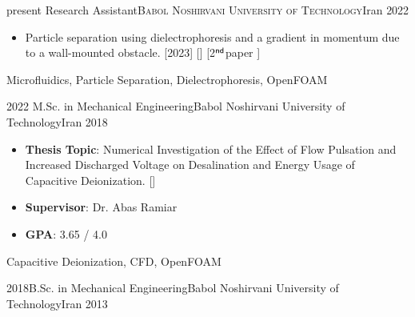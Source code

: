   \shorthandoff{:}

\begin{experiences}
  \experience
  {present}   {Research Assistant}{\normalfont\textsc{\small Babol Noshirvani University of Technology}}{Iran}
  {2022} {
    \begin{itemize}
      \item Particle separation using dielectrophoresis and a gradient in momentum due to a wall-mounted obstacle. [2023] [] [2$^{\sf{nd}}$\thinspace paper \hyperref[pub:derakhshan2023]{\color{linkcolor}{\footnotesize \kern-.4ex\raisebox{+.48ex}\faLevelDown}}]
    \end{itemize}
  }
  {Microfluidics, Particle Separation, Dielectrophoresis, OpenFOAM}
\end{experiences}

\vspace{-3pt}

\begin{experiences}
  \experience
  {2022}   {M.Sc. in Mechanical Engineering}{Babol Noshirvani University of Technology}{Iran}
  {2018} {
    \begin{itemize}
      \item \textbf{Thesis Topic}: Numerical Investigation of the Effect of Flow Pulsation and Increased Discharged Voltage on Desalination and Energy Usage of Capacitive Deionization. []\\[2pt]
      \item \textbf{Supervisor}: Dr. Abas Ramiar {\hyperref[recom:ramiar]{\color{linkcolor}{\footnotesize \kern-.4ex\raisebox{+.48ex}\faLevelDown}}}
      \item \textbf{GPA}: 3.65 / 4.0
      \vspace{3pt}
    \end{itemize}
  }
  {Capacitive Deionization, CFD, OpenFOAM}
\end{experiences}

\vspace{-10pt}


\begin{experiences}
  \experienceLite
  {2018}{B.Sc. in Mechanical Engineering}{Babol Noshirvani University of Technology}{Iran}
  {2013}
\end{experiences}



  \shorthandon{:}
\vspace{2pt}
